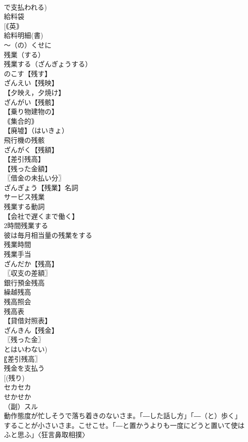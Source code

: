 \documentclass[8pt]{extreport}
\begin{document}
\begin{CJK}{UTF8}{min}
\\	で支払われる)
\\	給料袋
\\	[｟英｠ 
\\	給料明細(書)
\\	〜（の）くせに		
\\	残業（する）		
\\	残業する（ざんぎょうする）
\\	のこす【残す】 
\\	ざんえい【残映】
\\	【夕映え，夕焼け】
\\	ざんがい【残骸】
\\	【乗り物建物の】
\\	｟集合的｠ 
\\	【廃墟】（はいきょ）
\\	飛行機の残骸
\\	ざんがく【残額】
\\	【差引残高】
\\	【残った金額】
\\	〖借金の未払い分〗
\\	ざんぎょう【残業】名詞
\\	サービス残業
\\	残業する動詞
\\	【会社で遅くまで働く】
\\	2時間残業する
\\	彼は毎月相当量の残業をする
\\	残業時間
\\	残業手当
\\	ざんだか【残高】
\\	〖収支の差額〗
\\	銀行預金残高
\\	繰越残高
\\	残高照会
\\	残高表
\\	【貸借対照表】
\\	ざんきん【残金】
\\	〖残った金〗
\\	とはいわない) 
\\	〖差引残高〗
\\	残金を支払う
\\	[(残り) 
\\	セカセカ		
\\	せかせか
\\	（副）スル
\\	動作態度が忙しそうで落ち着きのないさま。「―した話し方」「―（と）歩く」
\\	することが小さいさま。こせこせ。「―と置かうよりも一度にどうと置いて使はふと思ふ」〈狂言鼻取相撲〉

\end{CJK}
\end{document}
